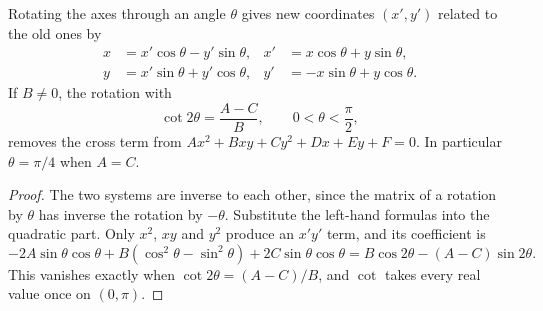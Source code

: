 \begin{theorem}\label{thm:rotation-of-axes}
  Rotating the axes through an angle $\theta$ gives new coordinates $(x', y')$
  related to the old ones by
  \[
    \begin{aligned}
      x &= x' \cos\theta - y' \sin\theta, &
      x' &= x \cos\theta + y \sin\theta, \\
      y &= x' \sin\theta + y' \cos\theta, &
      y' &= -x \sin\theta + y \cos\theta.
    \end{aligned}
  \]
  If $B \neq 0$, the rotation with
  \[
    \cot 2\theta = \frac{A - C}{B}, \qquad 0 < \theta < \frac{\pi}{2},
  \]
  removes the cross term from $Ax^2 + Bxy + Cy^2 + Dx + Ey + F = 0$. In
  particular $\theta = \pi/4$ when $A = C$.
\end{theorem}

\begin{proof}
  The two systems are inverse to each other, since the matrix of a rotation by
  $\theta$ has inverse the rotation by $-\theta$. Substitute the left-hand
  formulas into the quadratic part. Only $x^2$, $xy$ and $y^2$ produce an
  $x'y'$ term, and its coefficient is
  \[
    -2A \sin\theta\cos\theta + B(\cos^2\theta - \sin^2\theta)
    + 2C \sin\theta\cos\theta
    = B\cos 2\theta - (A - C)\sin 2\theta.
  \]
  This vanishes exactly when $\cot 2\theta = (A - C)/B$, and $\cot$ takes
  every real value once on $(0, \pi)$.
\end{proof}

